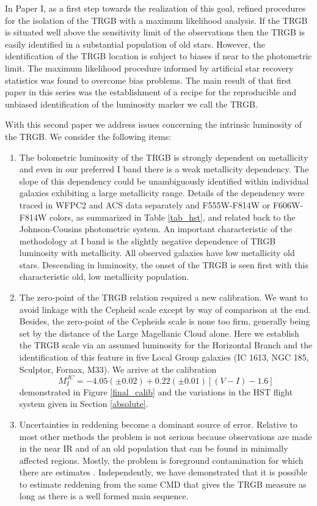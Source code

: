 \documentclass[11pt,preprint2]{aastex}
\begin{document}
In Paper I, as a first step towards the realization of this goal, \cite{2006AJ....132.2729M} refined procedures for the isolation of the TRGB with a maximum likelihood analysis. If the TRGB is situated well above the sensitivity limit of the observations then the TRGB is easily identified in a substantial population of old stars. However,  the identification of the TRGB location is subject to biases if near to the photometric limit. The maximum likelihood procedure informed by artificial star recovery statistics was found to overcome bias problems. The main result of that first paper in this series was the establishment of a recipe for the reproducible and unbiased identification of the luminosity marker we call the TRGB.

With this second paper we address issues concerning the intrinsic luminosity of the TRGB. We consider the following items:
\begin{enumerate}
\item The bolometric luminosity of the TRGB is strongly dependent on metallicity and even in our preferred I band there is a weak metallicity dependency. The slope of this dependency could be unambiguously identified within individual galaxies exhibiting a large metallicity range. Details of the dependency were traced in WFPC2 and ACS data separately and F555W-F814W or F606W-F814W colors, as summarized in Table \ref{tab_hst}, and related back to the Johnson-Cousins photometric system. An important characteristic of the methodology at I band is the slightly negative dependence of TRGB luminosity with metallicity. All observed galaxies have low metallicity old stars. Descending in luminosity, the onset of the TRGB is seen first with this characteristic old, low metallicity population.
\item The zero-point of the TRGB relation required a new calibration. We want to avoid linkage with the Cepheid scale except by way of comparison at the end. Besides, the zero-point of the Cepheids scale is none too firm, generally being set by the distance of the Large Magellanic Cloud alone. Here we establish the TRGB scale via an assumed luminosity for the Horizontal Branch and the identification of this feature in five Local Group galaxies (IC 1613, NGC 185, Sculptor, Fornax, M33). We arrive at the calibration
$$ M_I^{JC}=-4.05 (\pm 0.02) + 0.22 (\pm 0.01) [(V-I)-1.6] $$ demonstrated in Figure \ref{final_calib}
and the variations in the HST flight system given in Section \ref{absolute}.
\item Uncertainties in reddening become a dominant source of error. Relative to most other methods the problem is not serious because observations are made in the near IR and of an old population that can be found in minimally affected regions. Mostly, the problem is foreground contamination for which there are estimates \citep{1998ApJ...500..525S}. Independently, we have demonstrated that it is possible to estimate reddening from the same CMD that gives the TRGB measure as long as there is a well formed main sequence. 
\end{enumerate}
\end{document}
